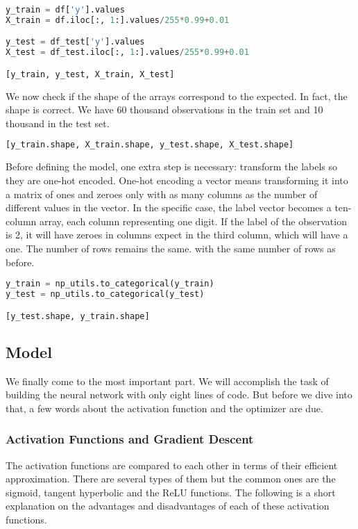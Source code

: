\begin{lstlisting}[language=Python]
y_train = df['y'].values
X_train = df.iloc[:, 1:].values/255*0.99+0.01

y_test = df_test['y'].values
X_test = df_test.iloc[:, 1:].values/255*0.99+0.01

[y_train, y_test, X_train, X_test]
\end{lstlisting}

We now check if the shape of the arrays correspond to the expected. In fact, the shape is correct. We have 60 thousand observations in the train set and 10 thousand in the test set.

\begin{lstlisting}[language=Python]
[y_train.shape, X_train.shape, y_test.shape, X_test.shape]
\end{lstlisting}

Before defining the model, one extra step is necessary: transform the labels so they are one-hot encoded. One-hot encoding a vector means transforming it into a matrix of ones and zeroes only with as many columns as the number of different values in the vector. In the specific case, the label vector becomes a ten-column array, each column representing one digit. If the label of the observation is 2, it will have zeroes in columns expect in the third column, which will have a one. The number of rows remains the same. with the same number of rows as before.

\begin{lstlisting}[language=Python]
y_train = np_utils.to_categorical(y_train)
y_test = np_utils.to_categorical(y_test)

[y_test.shape, y_train.shape]
\end{lstlisting}

\subsection{Model}

We finally come to the most important part. We will accomplish the task of building the neural network with only eight lines of code. But before we dive into that, a few words about the activation function and the optimizer are due.

\subsubsection{Activation Functions and Gradient Descent}

The activation functions are compared to each other in terms of their efficient approximation. There are several types of them but the common ones are the sigmoid, tangent hyperbolic and the ReLU functions. The following is a short explanation on the advantages and disadvantages of each of these activation functions. 


